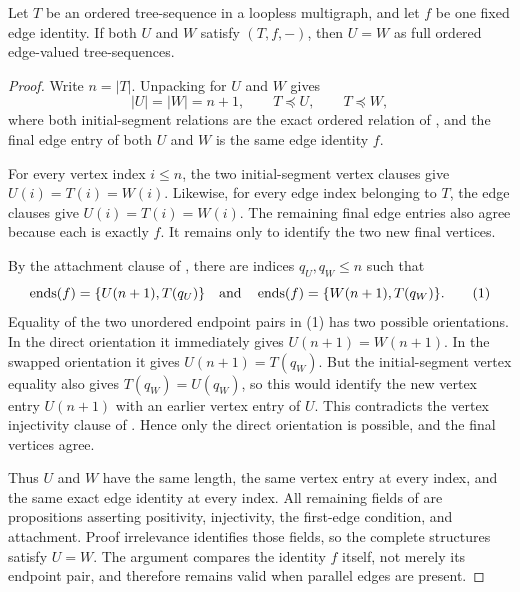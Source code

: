 \begin{lemma}
Let $T$ be an ordered tree-sequence in a loopless multigraph, and let $f$
be one fixed edge identity.  If both $U$ and $W$ satisfy
$(T,f,-)$, then $U=W$ as full ordered
edge-valued tree-sequences.
\end{lemma}
\begin{proof}
Write $n=|T|$.  Unpacking  for $U$ and
$W$ gives
\[
 |U|=|W|=n+1,
 \qquad T\preccurlyeq U,
 \qquad T\preccurlyeq W,
\]
where both initial-segment relations are the exact ordered relation of
, and the final edge entry of both
$U$ and $W$ is the same edge identity $f$.

For every vertex index $i\leq n$, the two initial-segment vertex clauses
give $U(i)=T(i)=W(i)$.  Likewise, for every edge index belonging to $T$,
the edge clauses give $U(i)=T(i)=W(i)$.  The remaining final edge entries
also agree because each is exactly $f$.  It remains only to identify the
two new final vertices.

By the attachment clause of , there are indices
$q_U,q_W\leq n$ such that
\[
  \operatorname{ends}(f)=
    \{U(n+1),T(q_U)\}
  \quad\hbox{and}\quad
  \operatorname{ends}(f)=
    \{W(n+1),T(q_W)\}.                                      \tag{1}
\]
Equality of the two unordered endpoint pairs in (1) has two possible
orientations.  In the direct orientation it immediately gives
$U(n+1)=W(n+1)$.  In the swapped orientation it gives
$U(n+1)=T(q_W)$.  But the initial-segment vertex equality also gives
$T(q_W)=U(q_W)$, so this would identify the new vertex entry $U(n+1)$
with an earlier vertex entry of $U$.  This contradicts the vertex
injectivity clause of .  Hence only the direct
orientation is possible, and the final vertices agree.

Thus $U$ and $W$ have the same length, the same vertex entry at every
index, and the same exact edge identity at every index.  All remaining
fields of  are propositions asserting positivity,
injectivity, the first-edge condition, and attachment.  Proof irrelevance
identifies those fields, so the complete structures satisfy $U=W$.
The argument compares the identity $f$ itself, not merely its endpoint
pair, and therefore remains valid when parallel edges are present.
\end{proof}
